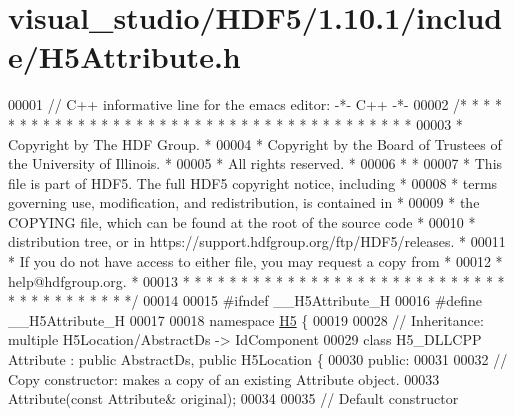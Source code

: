 \hypertarget{visual__studio_2_h_d_f5_21_810_81_2include_2_h5_attribute_8h_source}{}\section{visual\+\_\+studio/\+H\+D\+F5/1.10.1/include/\+H5\+Attribute.h}
\label{visual__studio_2_h_d_f5_21_810_81_2include_2_h5_attribute_8h_source}

\begin{DoxyCode}
00001 \textcolor{comment}{// C++ informative line for the emacs editor: -*- C++ -*-}
00002 \textcolor{comment}{/* * * * * * * * * * * * * * * * * * * * * * * * * * * * * * * * * * * * * * *}
00003 \textcolor{comment}{ * Copyright by The HDF Group.                                               *}
00004 \textcolor{comment}{ * Copyright by the Board of Trustees of the University of Illinois.         *}
00005 \textcolor{comment}{ * All rights reserved.                                                      *}
00006 \textcolor{comment}{ *                                                                           *}
00007 \textcolor{comment}{ * This file is part of HDF5.  The full HDF5 copyright notice, including     *}
00008 \textcolor{comment}{ * terms governing use, modification, and redistribution, is contained in    *}
00009 \textcolor{comment}{ * the COPYING file, which can be found at the root of the source code       *}
00010 \textcolor{comment}{ * distribution tree, or in https://support.hdfgroup.org/ftp/HDF5/releases.  *}
00011 \textcolor{comment}{ * If you do not have access to either file, you may request a copy from     *}
00012 \textcolor{comment}{ * help@hdfgroup.org.                                                        *}
00013 \textcolor{comment}{ * * * * * * * * * * * * * * * * * * * * * * * * * * * * * * * * * * * * * * */}
00014 
00015 \textcolor{preprocessor}{#ifndef \_\_H5Attribute\_H}
00016 \textcolor{preprocessor}{#define \_\_H5Attribute\_H}
00017 
00018 \textcolor{keyword}{namespace }\hyperlink{namespace_h5}{H5} \{
00019 
00028 \textcolor{comment}{//  Inheritance: multiple H5Location/AbstractDs -> IdComponent}
00029 \textcolor{keyword}{class }H5\_DLLCPP Attribute : \textcolor{keyword}{public} AbstractDs, \textcolor{keyword}{public} H5Location \{
00030    \textcolor{keyword}{public}:
00031 
00032         \textcolor{comment}{// Copy constructor: makes a copy of an existing Attribute object.}
00033         Attribute(\textcolor{keyword}{const} Attribute& original);
00034 
00035         \textcolor{comment}{// Default constructor}

\end{DoxyCode}

